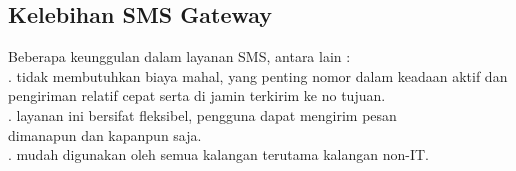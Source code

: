\documentclass[12pt,a4paper]{article}
\begin{document}
\subsection{Kelebihan SMS Gateway}
Beberapa keunggulan dalam layanan SMS, antara lain : \\
. tidak membutuhkan biaya mahal, yang penting nomor dalam keadaan \indent aktif dan pengiriman relatif cepat serta di jamin terkirim ke no tujuan. \\
. layanan ini bersifat fleksibel, pengguna dapat mengirim pesan\\ \indent dimanapun dan kapanpun saja. \\
. mudah digunakan oleh semua kalangan terutama kalangan non-IT. \\
\end{document}
